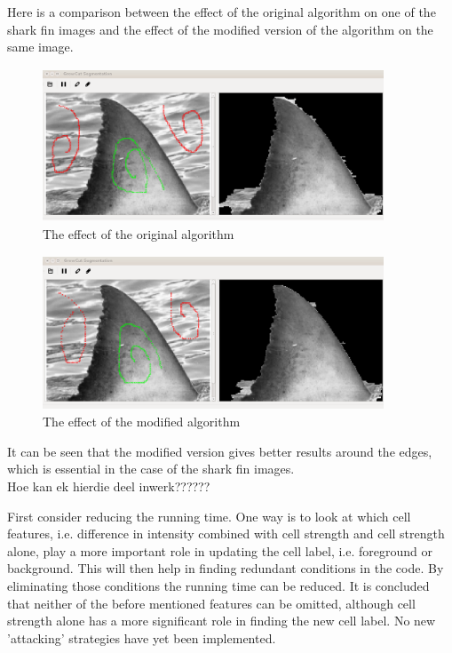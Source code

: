 \documentclass[a4paper,10pt]{article}
\begin{document}
\noindent Here is a comparison between the effect of the original algorithm on
one of the shark fin images and the effect of the modified version of the
algorithm on the same image.
\begin{figure}[H]
 \centering
 \includegraphics[width=4in, height=1.8in]{haaio}
 \caption{The effect of the original algorithm}
 \label{fin1}
\end{figure}

\begin{figure}[H]
 \centering
 \includegraphics[width=4in, height=1.8in]{haaim}
 \caption{The effect of the modified algorithm}
 \label{fin}
\end{figure}

\noindent It can be seen that the modified version gives better results around
the edges, which is essential in the case of the shark fin images. \\ 

Hoe kan ek hierdie deel inwerk??????

First consider reducing the running time.  One way is to look at which cell
features, i.e. difference in intensity combined with cell strength and cell
strength alone, play a more important role in updating the cell label, i.e.
foreground or background.   This will then help in finding 
redundant conditions in the code.  By eliminating those conditions the running
time can be reduced.  It is concluded that neither of the before
mentioned features can be omitted, although cell strength alone has a more
significant role in finding the new cell label.  No new 'attacking' 
strategies have yet been implemented. \\
\end{document}
